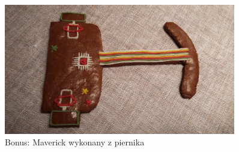\documentclass[12pt,a4paper]{article}
\begin{document}
\begin{figure}[tp]
\centering
\includegraphics[width=0.9\textwidth]{figures/1.jpg}
\caption{Bonus: Maverick wykonany z piernika \label{fig:p}}
\end{figure}
\end{document}
